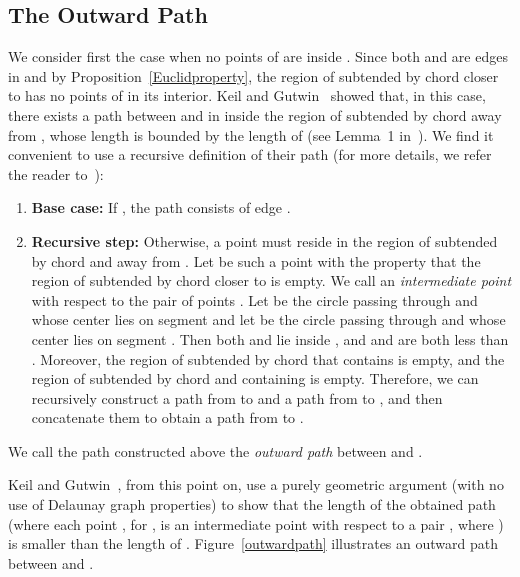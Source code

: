 \documentclass{stacs_proc}
\theoremstyle{plain}\newtheorem{satz}[thm]{Satz}
\begin{document}
\subsection{The Outward Path}
\label{outpath} We consider first the case when no points of  are
inside . Since both  and  are edges in  and by
Proposition~\ref{Euclidproperty}, the region of  subtended by chord 
closer to  has no points of  in its interior. Keil and Gutwin~\cite{keil}
showed that, in this case, there exists a path between  and  in 
inside the region of  subtended by chord  away from , whose
length is bounded by the length of 
(see Lemma~1 in~\cite{keil}). We find it convenient to use a recursive
definition of their path (for more details, we refer the reader
to~\cite{keil}):
\begin{enumerate}
\item {\bf Base case:} If , the path consists of edge .

\item {\bf Recursive step:} Otherwise, a point must reside in the
region of  subtended by chord  and away from .
Let  be such a point with the property that the region of
 subtended by chord  closer to  is empty.
We call  an {\em intermediate point} with respect to the pair of
points . Let  be the circle passing through  and
 whose center  lies on segment  and let  be the
circle passing through  and  whose center  lies on
segment . Then both  and  lie inside , and
 and  are both less than . Moreover, the region of  subtended by chord
 that contains  is empty, and the region of 
subtended by chord  and containing  is empty. Therefore, we
can recursively construct a path from  to  and a path from 
to , and then concatenate them to obtain a path from  to .
\end{enumerate}

\begin{definition}\rm
\label{outwardpathDEF} We call the path constructed above the {\em
outward path} between  and .
\end{definition}
Keil and Gutwin~\cite{keil}, from this point on, use
a purely geometric argument (with no use of Delaunay graph
properties) to show that the length of the obtained path  (where each point , for , is
an intermediate point with respect to a pair , where ) is smaller than the length of
. Figure~\ref{outwardpath} illustrates an
outward path between  and .
\end{document}

